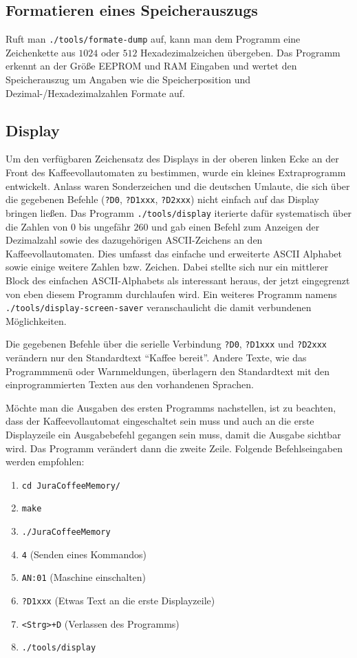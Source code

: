 \subsection{Formatieren eines Speicherauszugs}\label{subsec:formate-dump}
Ruft man \texttt{./tools/formate-dump} auf, kann man dem Programm eine Zeichenkette aus $1024$ oder $512$ Hexadezimalzeichen übergeben.
Das Programm erkennt an der Größe \ac{EEPROM} und \ac{RAM} Eingaben und wertet den Speicherauszug um Angaben wie die Speicherposition und Dezimal-/Hexadezimalzahlen Formate auf.

\subsection{Display}
Um den verfügbaren Zeichensatz des Displays in der oberen linken Ecke an der Front des Kaffeevollautomaten zu bestimmen, wurde ein kleines Extraprogramm entwickelt.
Anlass waren Sonderzeichen und die deutschen Umlaute, die sich über die gegebenen Befehle (\texttt{?D0}, \texttt{?D1xxx}, \texttt{?D2xxx}) nicht einfach auf das Display bringen ließen.
Das Programm \texttt{./tools/display} iterierte dafür systematisch über die Zahlen von $0$ bis ungefähr $260$ und gab einen Befehl zum Anzeigen der Dezimalzahl sowie des dazugehörigen \ac{ASCII}-Zeichens an den Kaffeevollautomaten.
Dies umfasst das einfache und erweiterte \ac{ASCII} Alphabet sowie einige weitere Zahlen bzw. Zeichen.
Dabei stellte sich nur ein mittlerer Block des einfachen \ac{ASCII}-Alphabets als interessant heraus, der jetzt eingegrenzt von eben diesem Programm durchlaufen wird.
Ein weiteres Programm namens \texttt{./tools/display-screen-saver} veranschaulicht die damit verbundenen Möglichkeiten.

Die gegebenen Befehle über die serielle Verbindung \texttt{?D0}, \texttt{?D1xxx} und \texttt{?D2xxx} verändern nur den Standardtext "`Kaffee bereit"'.
Andere Texte, wie das Programmmenü oder Warnmeldungen, überlagern den Standardtext mit den einprogrammierten Texten aus den vorhandenen Sprachen.

Möchte man die Ausgaben des ersten Programms nachstellen, ist zu beachten, dass der Kaffeevollautomat eingeschaltet sein muss und auch an die erste Displayzeile ein Ausgabebefehl gegangen sein muss, damit die Ausgabe sichtbar wird.
Das Programm verändert dann die zweite Zeile.
Folgende Befehlseingaben werden empfohlen:
\begin{enumerate}
  \item \texttt{cd JuraCoffeeMemory/}
  \item \texttt{make}
  \item \texttt{./JuraCoffeeMemory}
  \item \texttt{4} (Senden eines Kommandos)
  \item \texttt{AN:01} (Maschine einschalten)
  \item \texttt{?D1xxx} (Etwas Text an die erste Displayzeile)
  \item \texttt{<Strg>+D} (Verlassen des Programms)
  \item \texttt{./tools/display}
\end{enumerate}

